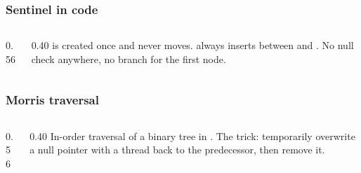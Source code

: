 \documentclass[aspectratio=169,10pt,compress]{beamer}
\begin{document}
\begin{frame}[t,fragile] \frametitle{Sentinel in code}
  \begin{columns}[T]
    \begin{column}{0.56\textwidth}
    \end{column}
    \begin{column}{0.40\textwidth}
      \small
       is created once and never moves.  always
      inserts between  and . No null check
      anywhere, no branch for the first node.
    \end{column}
  \end{columns}
\end{frame}





\begin{frame}[t,fragile] \frametitle{Morris traversal}
  \begin{columns}[T]
    \begin{column}{0.56\textwidth}
    \end{column}
    \begin{column}{0.40\textwidth}
      \small
      In-order traversal of a binary tree in .
      The trick: temporarily overwrite a null  pointer
      with a thread back to the predecessor, then remove it.
    \end{column}
  \end{columns}
\end{frame}
\end{document}

